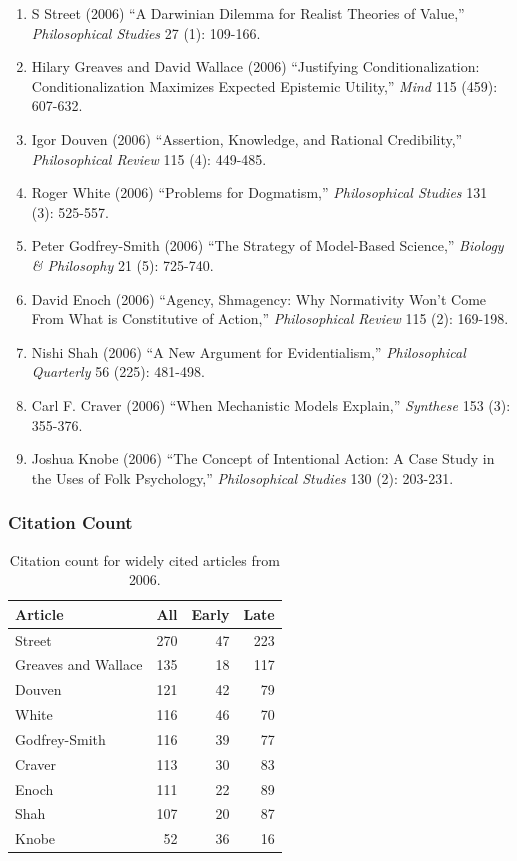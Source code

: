 \documentclass[
  10pt,
  letterpaper,
  DIV=11,
  numbers=noendperiod,
  twoside]{scrartcl}
\providecommand{\tightlist}{%
  \setlength{\itemsep}{0pt}\setlength{\parskip}{0pt}}\usepackage{longtable,booktabs,array}
\begin{document}
\begin{enumerate}
\def\labelenumi{\arabic{enumi}.}
\tightlist
\item
  S Street (2006) ``A Darwinian Dilemma for Realist Theories of Value,''
  \emph{Philosophical Studies} 27 (1): 109-166.
\item
  Hilary Greaves and David Wallace (2006) ``Justifying
  Conditionalization: Conditionalization Maximizes Expected Epistemic
  Utility,'' \emph{Mind} 115 (459): 607-632.
\item
  Igor Douven (2006) ``Assertion, Knowledge, and Rational Credibility,''
  \emph{Philosophical Review} 115 (4): 449-485.
\item
  Roger White (2006) ``Problems for Dogmatism,'' \emph{Philosophical
  Studies} 131 (3): 525-557.
\item
  Peter Godfrey-Smith (2006) ``The Strategy of Model-Based Science,''
  \emph{Biology \& Philosophy} 21 (5): 725-740.
\item
  David Enoch (2006) ``Agency, Shmagency: Why Normativity Won't Come
  From What is Constitutive of Action,'' \emph{Philosophical Review} 115
  (2): 169-198.
\item
  Nishi Shah (2006) ``A New Argument for Evidentialism,''
  \emph{Philosophical Quarterly} 56 (225): 481-498.
\item
  Carl F. Craver (2006) ``When Mechanistic Models Explain,''
  \emph{Synthese} 153 (3): 355-376.
\item
  Joshua Knobe (2006) ``The Concept of Intentional Action: A Case Study
  in the Uses of Folk Psychology,'' \emph{Philosophical Studies} 130
  (2): 203-231.
\end{enumerate}

\subsubsection*{Citation Count}\label{sec-count-2006}

\begin{longtable}[]{@{}lrrr@{}}

\caption{\label{tbl-citation-count-2006}Citation count for widely cited
articles from 2006.}

\tabularnewline

\toprule\noalign{}
Article & All & Early & Late \\
\midrule\noalign{}
\endhead
\bottomrule\noalign{}
\endlastfoot
Street & 270 & 47 & 223 \\
Greaves and Wallace & 135 & 18 & 117 \\
Douven & 121 & 42 & 79 \\
White & 116 & 46 & 70 \\
Godfrey-Smith & 116 & 39 & 77 \\
Craver & 113 & 30 & 83 \\
Enoch & 111 & 22 & 89 \\
Shah & 107 & 20 & 87 \\
Knobe & 52 & 36 & 16 \\

\end{longtable}
\end{document}
